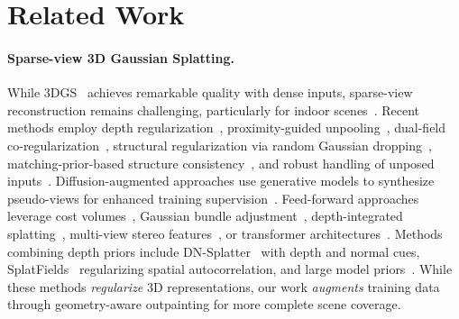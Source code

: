 \documentclass[runningheads]{llncs}
\begin{document}
\section{Related Work}
\label{sec:related}

\paragraph{Sparse-view 3D Gaussian Splatting.}
While 3DGS~\cite{kerbl20233d} achieves remarkable quality with dense inputs, sparse-view reconstruction remains challenging, particularly for indoor scenes~\cite{li2024genrc}. Recent methods employ depth regularization~\cite{li2024dngaussian,chung2023depth}, proximity-guided unpooling~\cite{zhu2024fsgs}, dual-field co-regularization~\cite{zhang2024cor}, structural regularization via random Gaussian dropping~\cite{park2025dropgaussian}, matching-prior-based structure consistency~\cite{peng2024scgaussian}, and robust handling of unposed inputs~\cite{lin2025longsplat}. Diffusion-augmented approaches use generative models to synthesize pseudo-views for enhanced training supervision~\cite{kong2025generative,yang2024gaussianobject}. Feed-forward approaches leverage cost volumes~\cite{chen2024mvsplat,charatan2024pixelsplat}, Gaussian bundle adjustment~\cite{fan2024instantsplat}, depth-integrated splatting~\cite{xu2025depthsplat}, multi-view stereo features~\cite{liu2024mvsgaussian}, or transformer architectures~\cite{wang2024freesplat,xu2025freesplatter,tang2024hisplat,min2024epipolar,szymanowicz2024splatter}. Methods combining depth priors include DN-Splatter~\cite{turkulainen2025dn} with depth and normal cues, SplatFields~\cite{mihajlovic2024splatfields} regularizing spatial autocorrelation, and large model priors~\cite{yu2024lm,wang2024use,he2025see,shih2025prior}. While these methods \emph{regularize} 3D representations, our work \emph{augments} training data through geometry-aware outpainting for more complete scene coverage.
\end{document}
